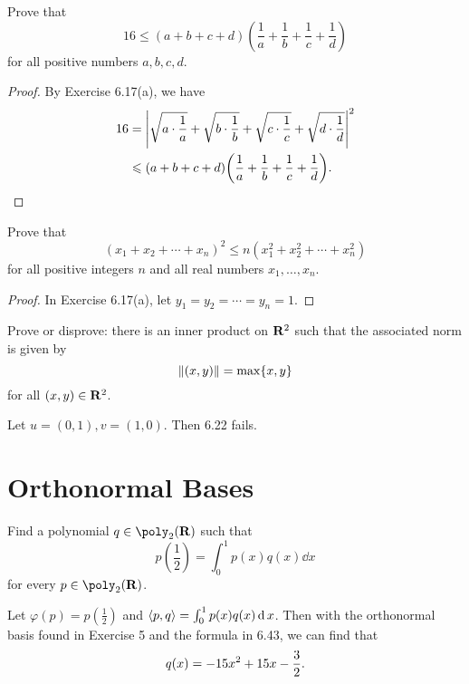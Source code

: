 \begin{exercise}{11}
	Prove that
	\[
		16 \le (a + b + c + d)\left(\frac{1}{a} + \frac{1}{b} + \frac{1}{c} + \frac{1}{d}\right)
	\]
	for all positive numbers \( a, b, c, d \).
\end{exercise}

\begin{proof}
	By Exercise 6.17(a), we have
	\begin{align*}
		16 &= \abs{\sqrt{a \cdot \frac{1}{a}} + \sqrt{b \cdot \frac{1}{b}} + \sqrt{c \cdot \frac{1}{c}} + \sqrt{d \cdot \frac{1}{d}}}^{2} \\
			 &\le (a + b + c + d)\left(\frac{1}{a} + \frac{1}{b} + \frac{1}{c} + \frac{1}{d}\right). \qedhere
	\end{align*}
\end{proof}

\begin{exercise}{12} Prove that \[
		(x_{1} + x_{2} + \cdots + x_{n})^{2} \le n\left(x_{1}^{2} + x_{2}^{2} + \cdots + x_{n}^{2}\right)
	\]
	for all positive integers \( n \) and all real numbers \( x_{1}, \ldots, x_{n} \).
\end{exercise}

\begin{proof}
	In Exercise 6.17(a), let \( y_{1} = y_{2} = \cdots = y_{n} = 1 \).
\end{proof}

\begin{exercise}{17}
	Prove or disprove: there is an inner product on \( \mathbf{R}^{2} \) such that the associated norm is given by
	\[
		\norm{(x, y)} = \max\{x, y\}
	\]
	for all \( (x, y) \in \mathbf{R}^{2} \).
\end{exercise}

\begin{countexam}
	Let \( u = (0, 1), v = (1, 0) \). Then 6.22 fails.
\end{countexam}

\section{Orthonormal Bases}

\begin{exercise}
	Find a polynomial \( q \in \poly_{2}(\R) \) such that
	\[
		p\left(\frac{1}{2}\right) = \int_{0}^{1} p(x)q(x)\dd{x}
	\]
	for every \( p \in \poly_{2}(\R) \).
\end{exercise}

\begin{solution}
	Let \( \varphi(p) = p\left(\frac{1}{2}\right) \) and \( \inp{p}{q} = \int_{0}^{1} p(x)q(x)\dd{x} \). Then with the orthonormal basis found in Exercise 5 and the formula in 6.43, we can find that
	\[
		q(x) = -15x^{2} + 15x - \frac{3}{2}. \qedhere
	\]
\end{solution}
